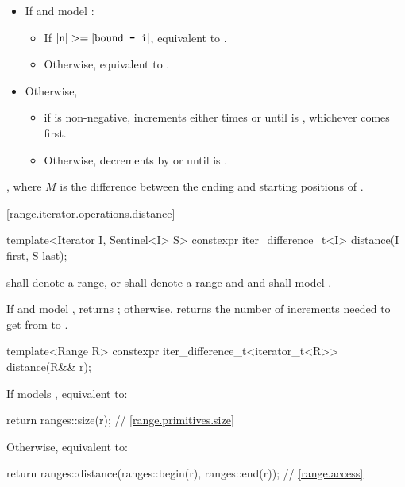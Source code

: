 \begin{addedblock}
\begin{itemdescr}
\pnum
\effects
\begin{itemize}
\item If  and  model :
  \begin{itemize}
  \item If \brk{}$|\texttt{n}| >= |\texttt{bound - i}|$,
    equivalent to .
  \item Otherwise, equivalent to .
  \end{itemize}
\item Otherwise,
  \begin{itemize}
  \item if  is non-negative, increments 
    either  times or until
     is ,
    whichever comes first.
  \item Otherwise, decrements  by 
    or until  is .
  \end{itemize}
\end{itemize}

\pnum
\returns
{}, where $M$ is the difference between
the ending and starting positions of .
\end{itemdescr}

[range.iterator.operations.distance]{}
%
\begin{itemdecl}
template<Iterator I, Sentinel<I> S>
  constexpr iter_difference_t<I> distance(I first, S last);
\end{itemdecl}

\begin{itemdescr}
\pnum
\expects
{} shall denote a range, or
 shall denote a range and
 and  shall model
.

\pnum
\effects
If  and  model ,
returns ;
otherwise, returns the number of increments needed to get from
to
.
\end{itemdescr}

%
\begin{itemdecl}
template<Range R>
  constexpr iter_difference_t<iterator_t<R>> distance(R&& r);
\end{itemdecl}

\begin{itemdescr}
\pnum
\effects
If  models , equivalent to:
\begin{codeblock}
return ranges::size(r); // \ref{range.primitives.size}
\end{codeblock}
Otherwise, equivalent to:
\begin{codeblock}
return ranges::distance(ranges::begin(r), ranges::end(r)); // \ref{range.access}
\end{codeblock}
\end{itemdescr}


\end{addedblock}
